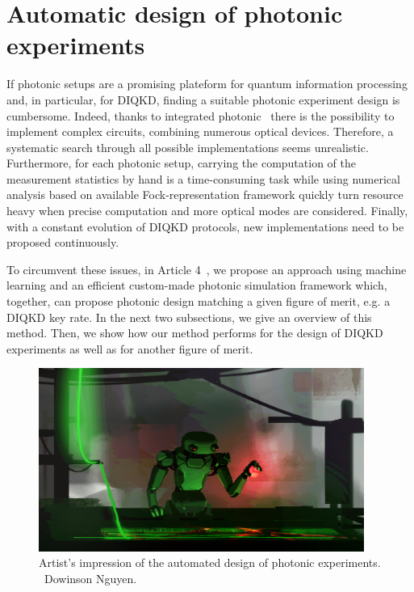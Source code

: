 %

\section{Automatic design of photonic experiments}

If photonic setups are a promising plateform for quantum information processing and, in particular, for DIQKD, finding a suitable photonic experiment design is cumbersome.
Indeed, thanks to integrated photonic~\cite{Pelucchi2021} there is the possibility to implement complex circuits, combining numerous optical devices.
Therefore, a systematic search through all possible implementations seems unrealistic.
Furthermore, for each photonic setup, carrying the computation of the measurement statistics by hand is a time-consuming task while using numerical analysis based on available Fock-representation framework quickly turn resource heavy when precise computation and more optical modes are considered.
Finally, with a constant evolution of DIQKD protocols, new implementations need to be proposed continuously.

To circumvent these issues, in Article 4~\cite{Valcarce2022b}, we propose an approach using machine learning and an efficient custom-made photonic simulation framework which, together, can propose photonic design matching a given figure of merit, e.g. a DIQKD key rate. 
In the next two subsections, we give an overview of this method.
Then, we show how our method performs for the design of DIQKD experiments as well as for another figure of merit.

\begin{figure}
	\begin{center}
		\includegraphics[width=0.95\textwidth]{chapters/deviceindependent/img/illustration_automated_design.png}
	\end{center}
	\caption{Artist's impression of the automated design of photonic experiments. \textcopyright\, Dowinson Nguyen.}
	\label{fig:}
\end{figure}



